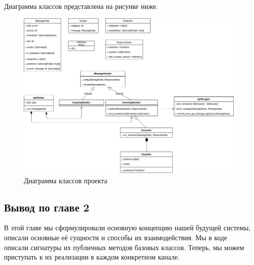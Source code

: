     Диаграмма классов представлена на рисунке ниже.

    \begin{figure}[H]
        \centering
        \includegraphics[width=\linewidth]{static/ClassDiagram.png}
        \caption{Диаграмма классов проекта}
        \label{fig:class-diagram}
    \end{figure}


    \subsection*{Вывод по главе 2}
    В этой главе мы сформулировали основную концепцию нашей будущей системы, 
    описали основные её сущности и способы их взаимодействия. Мы в коде описали 
    сигнатуры их публичных методов базовых классов.
    Теперь, мы можем приступать к их реализации в каждом конкретном канале.
